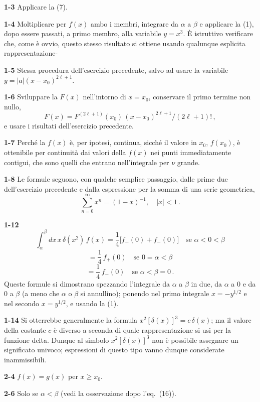 \documentclass[11pt, a4paper]{book}
\numberwithin{equation}{section}
\begin{document}
\textbf{1-3} \quad Applicare la (7).

\textbf{1-4} \quad Moltiplicare per $f(x)$ ambo i membri, integrare da $\alpha$ a $\beta$ e applicare la (1), dopo essere passati, a primo membro, alla variabile $y = x^3$. È istruttivo verificare che, come è ovvio, questo stesso risultato si ottiene usando qualunque esplicita rappresentazione-%

\textbf{1-5} \quad Stessa procedura dell'esercizio precedente, salvo ad usare la variabile $y = |a|(x-x_0)^{2\ell+1}$.

\textbf{1-6} \quad Sviluppare la $F(x)$ nell'intorno di $x = x_0$, conservare il primo termine non nullo,
\[
F(x) = F^{(2\ell+1)}(x_0)\,(x-x_0)^{2\ell+1}/(2\ell+1)!\,,
\]
e usare i risultati dell'esercizio precedente.

\textbf{1-7} \quad Perché la $f(x)$ è, per ipotesi, continua, sicché il valore in $x_0$, $f(x_0)$, è ottenibile per continuità dai valori della $f(x)$ nei punti immediatamente contigui, che sono quelli che entrano nell'integrale per $\nu$ grande.

\textbf{1-8} \quad Le formule seguono, con qualche semplice passaggio, dalle prime due dell'esercizio precedente e dalla espressione per la somma di una serie geometrica,
\[
\sum_{n=0}^{\infty} x^n = (1-x)^{-1}, \quad |x| < 1 \,.
\]

\textbf{1-12}
\[
\int_{\alpha}^{\beta} dx\, x\, \delta(x^2)\, f(x) = \frac{1}{4}\bigl[f_+(0) + f_-(0)\bigr] \quad \text{se } \alpha < 0 < \beta
\]
\[
= \frac{1}{4}\, f_+(0) \quad \text{se } 0 = \alpha < \beta
\]
\[
= \frac{1}{4}\, f_-(0) \quad \text{se } \alpha < \beta = 0 \,.
\]
Queste formule si dimostrano spezzando l'integrale da $\alpha$ a $\beta$ in due, da $\alpha$ a $0$ e da $0$ a $\beta$ (a meno che $\alpha$ o $\beta$ si annullino); ponendo nel primo integrale $x = -y^{1/2}$ e nel secondo $x = y^{1/2}$, e usando la (1).

\textbf{1-14} \quad Si otterrebbe generalmente la formula $x^2[\delta(x)]^3 = c\,\delta(x)$; ma il valore della costante $c$ è diverso a seconda di quale rappresentazione si usi per la funzione delta. Dunque al simbolo $x^2[\delta(x)]^3$ non è possibile assegnare un significato univoco; espressioni di questo tipo vanno dunque considerate inammissibili.

\textbf{2-4} \quad $f(x) = g(x)$ per $x \geq x_0$.

\textbf{2-6} \quad Solo se $\alpha < \beta$ (vedi la osservazione dopo l'eq.~(16)).
\end{document}

